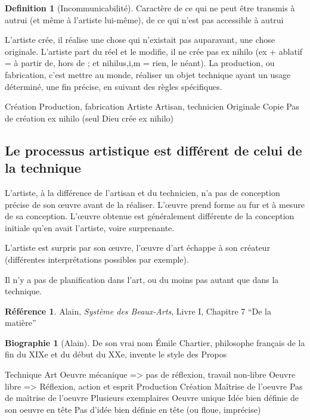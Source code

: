 \documentclass[french]{book}
\theoremstyle{definition}
\newtheorem*{dfn}{Definition}
\newtheorem*{refe}{Référence}
\newtheorem*{bio}{Biographie}
\begin{document}
\begin{dfn}[Incommunicabilité]
Caractère de ce qui ne peut être transmis à autrui (et même à l'artiste lui-même), de ce qui n'est pas accessible à autrui
\end{dfn}



L’artiste crée, il réalise une chose qui n’existait pas auparavant, une chose originale. L’artiste part du réel et le modifie, il ne crée pas ex nihilo (ex + ablatif = à partir de, hors de ; et nihilus,i,m = rien, le néant).
La production, ou fabrication, c’est mettre au monde, réaliser un objet technique ayant un usage déterminé, une fin précise, en suivant des règles spécifiques.

Création
Production, fabrication
Artiste
Artisan, technicien
Originale
Copie
Pas de création ex nihilo (seul Dieu crée ex nihilo)





\subsection{Le processus artistique est différent de celui de la technique}

L’artiste, à la différence de l’artisan et du technicien, n’a pas de conception précise de son œuvre avant de la réaliser.
L'œuvre prend forme au fur et à mesure de sa conception. L'œuvre obtenue est généralement différente de la conception initiale qu’en avait l’artiste, voire surprenante.

L’artiste est surpris par son œuvre, l'œuvre d’art échappe à son créateur (différentes interprétations possibles par exemple).

Il n’y a pas de planification dans l’art, ou du moins pas autant que dans la technique.

\begin{refe}
	Alain, \textit{Système des Beaux-Arts}, Livre I, Chapitre 7 “De la matière”
\end{refe}

\begin{bio}[Alain]
	De son vrai nom Émile Chartier, philosophe français de la fin du XIXe et du début du XXe, invente le style des Propos
\end{bio}

Technique
Art
Oeuvre mécanique => pas de réflexion, travail non-libre
Oeuvre libre => Réflexion, action et esprit
Production
Création
Maîtrise de l’oeuvre
Pas de maîtrise de l’oeuvre
Plusieurs exemplaires
Oeuvre unique
Idée bien définie de son oeuvre en tête
Pas d’idée bien définie en tête (ou floue, imprécise)
\end{document}

